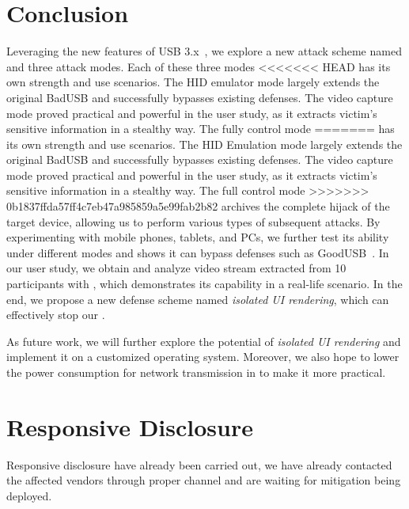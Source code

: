 \section{Conclusion}
\label{sec:conclusion}

Leveraging the new features of USB 3.x~\cite{usb30,usb31,usb32}, we explore a
new attack scheme named \tool and three attack modes. Each of these three modes
<<<<<<< HEAD
has its own strength and use scenarios. The HID emulator mode largely extends the
original BadUSB and successfully bypasses existing defenses. The video capture mode proved practical and powerful in the user study, as it extracts
victim's sensitive information in a stealthy way. The fully control mode
=======
has its own strength and use scenarios. The HID Emulation mode largely extends the
original BadUSB and successfully bypasses existing defenses. The video capture mode proved practical and powerful in the user study, as it extracts
victim's sensitive information in a stealthy way. The full control mode
>>>>>>> 0b1837ffda57ff4c7eb47a985859a5e99fab2b82
archives the complete hijack of the target device, allowing us to perform various
types of subsequent attacks. By experimenting \tool with mobile phones, tablets,
and PCs, we further test its ability under different modes and shows it can
bypass defenses such as GoodUSB~\cite{tian2015defending}. In our user study, we
obtain and analyze video stream extracted from 10 participants with \tool,
which demonstrates its capability in a real-life scenario. In the end, we
propose a new defense scheme named \textit{isolated UI rendering}, which can
effectively stop our \tool.

As future work, we will further explore the potential of \textit{isolated UI
rendering} and implement it on a customized operating system. Moreover, we also
hope to lower the power consumption for network transmission in \tool to make
it more practical.

\section{Responsive Disclosure}

Responsive disclosure have already been carried out, we have already contacted the affected vendors through proper channel and are waiting for mitigation being deployed.